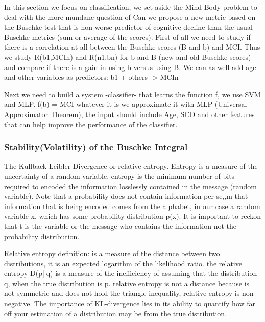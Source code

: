 \documentclass[9pt,twocolumn,twoside]{pnas-new}
\begin{document}
In this section we focus on classification, we set aside the Mind-Body problem to deal with the more mundane question of Can we propose a new metric based on the Buschke test that is non worse predictor of cognitive decline than the usual Buschke metrics (sum or average of the scores).
First of all we need to study if there is a correlation at all between the Buschke scores (B and b) and MCI. Thus we study R(b1,MCIn) and R(n1,bn) for b and B (new and old Buschke scores) and compare if there is a gain in using b versus using B. We can as well add age and other variables as predictors: b1 + others -> MCIn

Next we need to build a system -classifier- that learns the function f, we use SVM and MLP.
f(b) = MCI whatever it is we approximate it with MLP (Universal Approximator Theorem), the input should include Age, SCD and other features that can help improve the performance of the classifier.






\subsubsection*{Stability(Volatility) of the Buschke Integral}
The Kullback-Leibler Divergence or relative entropy. Entropy is a measure of the uncertainty of a random variable, entropy is the minimum number of bits required to encoded the information losslessly contained in the message (random variable). Note that a probability does not contain information per se,,m that information that is being encoded comes from the alphabet, in our case a random variable x, which has some probability distribution p(x). It is important to reckon that t is the variable or the message who contains the information not the probability distribution.

Relative entropy definition: is a measure of the distance between two distributions, it is an expected logarithm of the likelihood ratio. the relative entropy D(p||q) is a measure of the inefficiency of assuming that the distribution q, when the true distribution is p.
relative entropy is not a distance because is not symmetric and does not hold the triangle inequality, relative entropy is non negative.
The importance of KL-divergence lies in its ability to quantify how far off your estimation of a distribution may be from the true distribution.
\end{document}
